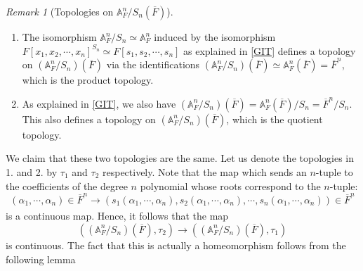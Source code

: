 \documentclass[11pt,a4paper]{article}
\theoremstyle{definition}
\theoremstyle{plain}
\theoremstyle{remark}
\newtheorem{R}[shared]{Remark}
\theoremstyle{plain}
\begin{document}
\begin{R}[Topologies on $\mathbb{A}_F^n/S_n(\overline{F})$]\label{topologiesaresame}
    \begin{enumerate}
        \item The isomorphism $\mathbb{A}_F^n/S_n \simeq \mathbb{A}_F^n$ induced by the isomorphism $F[x_1, x_2, \cdots, x_n]^{S_n} \simeq F[s_1, s_2, \cdots, s_n]$ as explained in \ref{GIT} defines a topology on $(\mathbb{A}_F^n/S_n)(\overline{F})$ via the identifications $(\mathbb{A}_F^n/S_n)(\overline{F}) \simeq \mathbb{A}_F^n(\overline{F}) = \overline{F}^n$, which is the product topology.
        \item As explained in \ref{GIT}, we also have $(\mathbb{A}_F^n/S_n)(\overline{F}) = \mathbb{A}_F^n(\overline{F})/S_n = \overline{F}^n/S_n$. This also defines a topology on $(\mathbb{A}_F^n/S_n)(\overline{F})$, which is the quotient topology.
    \end{enumerate}
    We claim that these two topologies are the same. Let us denote the topologies in 1. and 2. by $\tau_1$ and $\tau_2$ respectively. Note that the map which sends an $n$-tuple to the coefficients of the degree $n$ polynomial whose roots correspond to the $n$-tuple: $$(\alpha_1, \cdots, \alpha_n) \in \overline{F}^n \xrightarrow[]{} (s_1(\alpha_1,\cdots,\alpha_n), s_2(\alpha_1, \cdots, \alpha_n), \cdots, s_n(\alpha_1, \cdots, \alpha_n)) \in \overline{F}^n$$ is a continuous map. Hence, it follows that the map $$((\mathbb{A}_F^n/S_n)(\overline{F}), \tau_2) \xrightarrow[]{} ((\mathbb{A}_F^n/S_n)(\overline{F}), \tau_1)$$ is continuous. The fact that this is actually a homeomorphism follows from the following lemma
\end{R}
\end{document}
